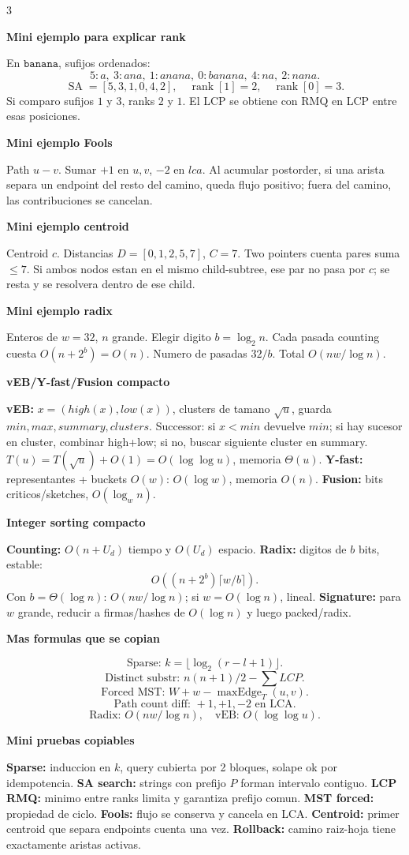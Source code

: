 \documentclass[8pt]{extarticle}
\newcommand{\blk}[2]{%
  \vspace{1.3pt}
  \noindent\colorbox{head}{\parbox{\linewidth-2\fboxsep}{\textbf{#1}}}\par
  {\footnotesize #2}\par
}
\newcommand{\bigO}{O}
\newcommand{\SA}{\operatorname{SA}}
\newcommand{\rankv}{\operatorname{rank}}
\begin{document}
\begin{multicols}{3}
\blk{Mini ejemplo para explicar rank}{
En \(\texttt{banana}\), sufijos ordenados:
\[
5:a,\ 3:ana,\ 1:anana,\ 0:banana,\ 4:na,\ 2:nana.
\]
\[
\SA=[5,3,1,0,4,2],\quad \rankv[1]=2,\quad \rankv[0]=3.
\]
Si comparo sufijos \(1\) y \(3\), ranks \(2\) y \(1\). El LCP se obtiene con RMQ en LCP entre esas posiciones.}

\blk{Mini ejemplo Fools}{
Path \(u-v\). Sumar \(+1\) en \(u,v\), \(-2\) en \(lca\). Al acumular postorder, si una arista separa un endpoint del resto del camino, queda flujo positivo; fuera del camino, las contribuciones se cancelan.}

\blk{Mini ejemplo centroid}{
Centroid \(c\). Distancias \(D=[0,1,2,5,7]\), \(C=7\). Two pointers cuenta pares suma \(\le7\). Si ambos nodos estan en el mismo child-subtree, ese par no pasa por \(c\); se resta y se resolvera dentro de ese child.}

\blk{Mini ejemplo radix}{
Enteros de \(w=32\), \(n\) grande. Elegir digito \(b=\log_2 n\). Cada pasada counting cuesta \(\bigO(n+2^b)=\bigO(n)\). Numero de pasadas \(32/b\). Total \(\bigO(nw/\log n)\).}

\blk{vEB/Y-fast/Fusion compacto}{
\textbf{vEB:} \(x=(high(x),low(x))\), clusters de tamano \(\sqrt u\), guarda \(min,max,summary,clusters\). Successor: si \(x<min\) devuelve \(min\); si hay sucesor en cluster, combinar high+low; si no, buscar siguiente cluster en summary. \(T(u)=T(\sqrt u)+O(1)=O(\log\log u)\), memoria \(\Theta(u)\). 
\textbf{Y-fast:} representantes + buckets \(O(w)\): \(O(\log w)\), memoria \(O(n)\).
\textbf{Fusion:} bits criticos/sketches, \(O(\log_w n)\).}

\blk{Integer sorting compacto}{
\textbf{Counting:} \(O(n+U_d)\) tiempo y \(O(U_d)\) espacio. 
\textbf{Radix:} digitos de \(b\) bits, estable:
\[
O((n+2^b)\lceil w/b\rceil).
\]
Con \(b=\Theta(\log n)\): \(O(nw/\log n)\); si \(w=O(\log n)\), lineal. 
\textbf{Signature:} para \(w\) grande, reducir a firmas/hashes de \(O(\log n)\) y luego packed/radix.}

\blk{Mas formulas que se copian}{
\[
\text{Sparse: } k=\lfloor\log_2(r-l+1)\rfloor.
\]
\[
\text{Distinct substr: } n(n+1)/2-\sum LCP.
\]
\[
\text{Forced MST: } W+w-\operatorname{maxEdge}_T(u,v).
\]
\[
\text{Path count diff: } +1,+1,-2\text{ en LCA}.
\]
\[
\text{Radix: } O(nw/\log n),\quad
\text{vEB: }O(\log\log u).
\]}

\blk{Mini pruebas copiables}{
\textbf{Sparse:} induccion en \(k\), query cubierta por 2 bloques, solape ok por idempotencia. 
\textbf{SA search:} strings con prefijo \(P\) forman intervalo contiguo. 
\textbf{LCP RMQ:} minimo entre ranks limita y garantiza prefijo comun. 
\textbf{MST forced:} propiedad de ciclo. 
\textbf{Fools:} flujo se conserva y cancela en LCA. 
\textbf{Centroid:} primer centroid que separa endpoints cuenta una vez. 
\textbf{Rollback:} camino raiz-hoja tiene exactamente aristas activas.}


\end{multicols}
\end{document}
